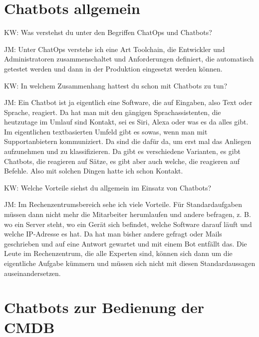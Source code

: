 \section*{Chatbots allgemein}

\begin{list}{X:}{\setlength{\labelsep}{5mm}}
\item[KW:] Was verstehst du unter den Begriffen ChatOps und Chatbots?
\item[JM:] Unter ChatOps verstehe ich eine Art Toolchain, die Entwickler und Administratoren zusammenschaltet und Anforderungen definiert, die automatisch getestet werden und dann in der Produktion eingesetzt werden können.
\item[KW:] In welchem Zusammenhang hattest du schon mit Chatbots zu tun?
\item[JM:] Ein Chatbot ist ja eigentlich eine Software, die auf Eingaben, also Text oder Sprache, reagiert. Da hat man mit den gängigen Sprachassistenten, die heutzutage im Umlauf sind Kontakt, sei es Siri, Alexa oder was es da alles gibt. Im eigentlichen textbasierten Umfeld gibt es sowas, wenn man mit Supportanbietern kommuniziert. Da sind die dafür da, um erst mal das Anliegen aufzunehmen und zu klassifizieren. Da gibt es verschiedene Varianten, es gibt Chatbots, die reagieren auf Sätze, es gibt aber auch welche, die reagieren auf Befehle. Also mit solchen Dingen hatte ich schon Kontakt.
\item[KW:] Welche Vorteile siehst du allgemein im Einsatz von Chatbots?
\item[JM:] Im Rechenzentrumsbereich sehe ich viele Vorteile. Für Standardaufgaben müssen dann nicht mehr die Mitarbeiter herumlaufen und andere befragen, z. B. wo ein Server steht, wo ein Gerät sich befindet, welche Software darauf läuft und welche IP-Adresse es hat. Da hat man bisher andere gefragt oder Mails geschrieben und auf eine Antwort gewartet und mit einem Bot entfällt das. Die Leute im Rechenzentrum, die alle Experten sind, können sich dann um die eigentliche Aufgabe kümmern und müssen sich nicht mit diesen Standardaussagen auseinandersetzen.
\end{list}

\section*{Chatbots zur Bedienung der CMDB}

